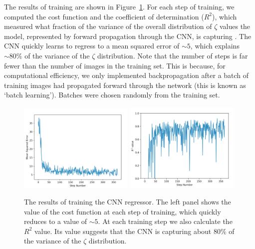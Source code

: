 The results of training are shown in Figure~\ref{fig:CNN_training_results}. For each step of training, we computed the cost function and the coefficient of determination ($R^2$), which measured what fraction of the variance of the overall distribution of $\zeta$ values the model, represented by forward propagation through the CNN, is capturing \citep[e.g.][]{Glantz.90}. The CNN quickly learns to regress to a mean squared error of $\sim 5$, which explains $\sim 80\%$ of the variance of the $\zeta$ distribution. Note that the number of steps is far fewer than the number of images in the training set. This is because, for computational efficiency, we only implemented backpropagation after a batch of training images had propagated forward through the network (this is known as `batch learning'). Batches were chosen randomly from the training set.

\begin{figure}
\centering
\includegraphics[width=0.49\textwidth]{chapters/hera_ml/figures/zeta-MSE.png}
\includegraphics[width=0.49\textwidth]{chapters/hera_ml/figures/zeta-R2.png}
\caption[The results of training the CNN regressor.]{The results of training the CNN regressor. The left panel shows the value of the cost function at each step of training, which quickly reduces to a value of $\sim 5$. At each training step we also calculate the $R^2$ value. Its value suggests that the CNN is capturing about 80\% of the variance of the $\zeta$ distribution.}
\label{fig:CNN_training_results}
\end{figure}

